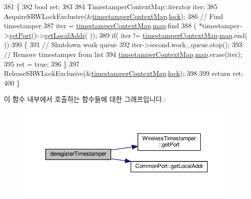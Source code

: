 \begin{DoxyCode}
381 \{
382     \textcolor{keywordtype}{bool} ret;
383 
384     TimestamperContextMap::iterator iter;
385     AcquireSRWLockExclusive(&\hyperlink{intel__wireless_8cpp_a6308a285d09ed3d9d4a00645a386adad}{timestamperContextMap}.\hyperlink{class_locked_timestamper_context_map_afed18a2dbad108768defb51810a7a760}{lock});
386     \textcolor{comment}{// Find timestamper}
387     iter = \hyperlink{intel__wireless_8cpp_a6308a285d09ed3d9d4a00645a386adad}{timestamperContextMap}.\hyperlink{class_locked_timestamper_context_map_a8880e18111e491249278c4cebf453b97}{map}.find
388         ( *timestamper->\hyperlink{class_wireless_timestamper_aad42db1d6ccc40f2bebc5ba544d738d8}{getPort}()->\hyperlink{class_common_port_ab6607250666be12220407c6c12671f65}{getLocalAddr}( ));
389     \textcolor{keywordflow}{if}( iter != \hyperlink{intel__wireless_8cpp_a6308a285d09ed3d9d4a00645a386adad}{timestamperContextMap}.\hyperlink{class_locked_timestamper_context_map_a8880e18111e491249278c4cebf453b97}{map}.end( ))
390     \{
391         \textcolor{comment}{// Shutdown work queue}
392         iter->second.work\_queue.stop();
393         \textcolor{comment}{// Remove timestamper from list}
394         \hyperlink{intel__wireless_8cpp_a6308a285d09ed3d9d4a00645a386adad}{timestamperContextMap}.\hyperlink{class_locked_timestamper_context_map_a8880e18111e491249278c4cebf453b97}{map}.erase(iter);
395         ret = \textcolor{keyword}{true};
396     \}
397     ReleaseSRWLockExclusive(&\hyperlink{intel__wireless_8cpp_a6308a285d09ed3d9d4a00645a386adad}{timestamperContextMap}.\hyperlink{class_locked_timestamper_context_map_afed18a2dbad108768defb51810a7a760}{lock});
398 
399     \textcolor{keywordflow}{return} ret;
400 \}
\end{DoxyCode}


이 함수 내부에서 호출하는 함수들에 대한 그래프입니다.\+:
\nopagebreak
\begin{figure}[H]
\begin{center}
\leavevmode
\includegraphics[width=350pt]{class_intel_wireless_adapter_a4a39d6d7f3a9dd3e80b607cc2ffdac7f_cgraph}
\end{center}
\end{figure}




